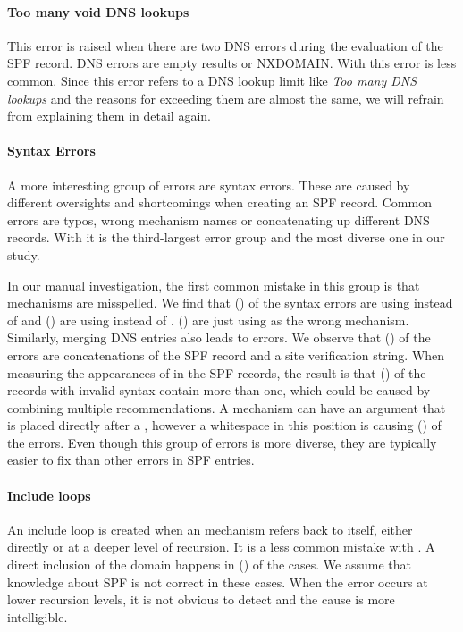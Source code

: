 \paragraph{Too many void DNS lookups}
This error is raised when there are two DNS errors during the evaluation of the SPF record.
DNS errors are empty results or NXDOMAIN.
With \SPFTooManyDNSLookupsPerc this error is less common.
Since this error refers to a DNS lookup limit like \emph{Too many DNS lookups} and the reasons for exceeding them are almost the same, we will refrain from explaining them in detail again.

\paragraph{Syntax Errors}
A more interesting group of errors are syntax errors.
These are caused by different oversights and shortcomings when creating an SPF record.
Common errors are typos, wrong mechanism names or concatenating up different DNS records.
With \SPFSyntaxErrorPerc it is the third-largest error group and the most diverse one in our study.

In our manual investigation, the first common mistake in this group is that mechanisms are misspelled.
We find that \SyntaxErrorIPvFourPerc (\numprint{\SyntaxErrorIPvFour}) of the syntax errors are using  instead of  and \SyntaxErrorIPvSixPerc (\numprint{\SyntaxErrorIPvSix}) are using  instead of .
\SyntaxErrorIPPerc (\numprint{\SyntaxErrorIP}) are just using  as the wrong mechanism. 
Similarly, merging DNS entries also leads to errors.
We observe that \SyntaxErrorSiteVerificationPerc (\numprint{\SyntaxErrorSiteVerification}) of the errors are concatenations of the SPF record and a site verification string.
When measuring the appearances of  in the SPF records, the result is that \SyntaxErrorMultipleSpfPerc (\numprint{\SyntaxErrorMultipleSpf}) of the records with invalid syntax contain more than one, which could be caused by combining multiple recommendations.
A mechanism can have an argument that is placed directly after a \spfcode{:}, however a whitespace in this position is causing \SyntaxErrorWhitespacePerc (\numprint{\SyntaxErrorWhitespace}) of the errors.
Even though this group of errors is more diverse, they are typically easier to fix than other errors in SPF entries.

\paragraph{Include loops}
An include loop is created when an  mechanism refers back to itself, either directly or at a deeper level of recursion.
It is a less common mistake with \SPFIncludeLoopPerc.
A direct inclusion of the domain happens in \SPFIncludeLoopOnePerc (\numprint{\SPFIncludeLoopOne}) of the cases.
We assume that knowledge about SPF is not correct in these cases.
When the error occurs at lower recursion levels, it is not obvious to detect and the cause is more intelligible.

